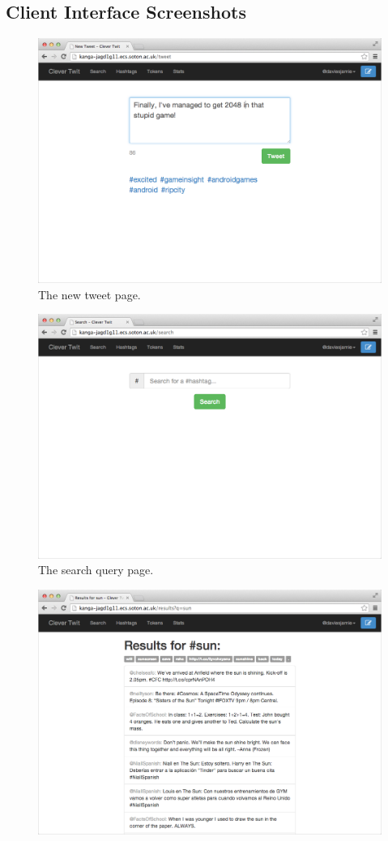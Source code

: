 \documentclass[11pt,a4paper]{report}
\begin{document}
\begin{subappendices}
\section{Client Interface Screenshots}
\label{appendix:screenshots}
\begin{figure}[htpb]
    \centering
    \includegraphics[width=0.75\linewidth]{screenshots/tweet2.png}
    \caption{The new tweet page.}
    \label{fig:screenshots:tweet}
\end{figure}
\begin{figure}[htpb]
    \centering
    \includegraphics[width=0.75\linewidth]{screenshots/search2.png}
    \caption{The search query page.}
    \label{fig:screenshots:search}
\end{figure}
\begin{figure}[htpb]
    \centering
    \includegraphics[width=0.75\linewidth]{screenshots/results2.png}

\end{figure}
\end{subappendices}
\end{document}

